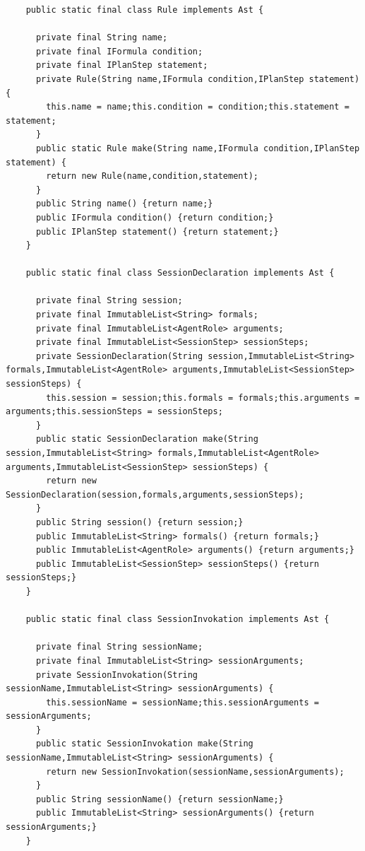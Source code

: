 \documentclass[a4paper,12pt,oneside,fleqn]{book} %
\begin{document}
{\begin{verbatim}
    public static final class Rule implements Ast {
      
      private final String name;
      private final IFormula condition;
      private final IPlanStep statement;
      private Rule(String name,IFormula condition,IPlanStep statement) {
        this.name = name;this.condition = condition;this.statement = statement;
      }
      public static Rule make(String name,IFormula condition,IPlanStep statement) {
        return new Rule(name,condition,statement);
      }
      public String name() {return name;}
      public IFormula condition() {return condition;}
      public IPlanStep statement() {return statement;}
    }
  
    public static final class SessionDeclaration implements Ast {
      
      private final String session;
      private final ImmutableList<String> formals;
      private final ImmutableList<AgentRole> arguments;
      private final ImmutableList<SessionStep> sessionSteps;
      private SessionDeclaration(String session,ImmutableList<String> formals,ImmutableList<AgentRole> arguments,ImmutableList<SessionStep> sessionSteps) {
        this.session = session;this.formals = formals;this.arguments = arguments;this.sessionSteps = sessionSteps;
      }
      public static SessionDeclaration make(String session,ImmutableList<String> formals,ImmutableList<AgentRole> arguments,ImmutableList<SessionStep> sessionSteps) {
        return new SessionDeclaration(session,formals,arguments,sessionSteps);
      }
      public String session() {return session;}
      public ImmutableList<String> formals() {return formals;}
      public ImmutableList<AgentRole> arguments() {return arguments;}
      public ImmutableList<SessionStep> sessionSteps() {return sessionSteps;}
    }
  
    public static final class SessionInvokation implements Ast {
      
      private final String sessionName;
      private final ImmutableList<String> sessionArguments;
      private SessionInvokation(String sessionName,ImmutableList<String> sessionArguments) {
        this.sessionName = sessionName;this.sessionArguments = sessionArguments;
      }
      public static SessionInvokation make(String sessionName,ImmutableList<String> sessionArguments) {
        return new SessionInvokation(sessionName,sessionArguments);
      }
      public String sessionName() {return sessionName;}
      public ImmutableList<String> sessionArguments() {return sessionArguments;}
    }
  

\end{verbatim}}
\end{document}
